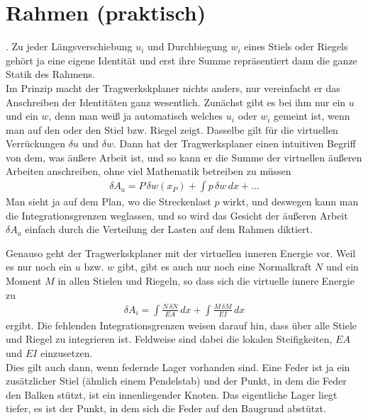 \section{Rahmen (praktisch)}
. Zu jeder L\"{a}ngsverschiebung $u_i $ und Durchbiegung $w_i $ eines Stiels oder Riegels geh\"{o}rt ja eine eigene Identit\"{a}t und erst ihre Summe repr\"{a}sentiert dann die ganze Statik des Rahmens.\\

Im Prinzip macht der Tragwerkskplaner nichts anders, nur vereinfacht er das Anschreiben der Identit\"{a}ten ganz wesentlich. Zun\"{a}chst gibt es bei ihm nur ein $u$ und ein $w$, denn man wei{\ss} ja automatisch welches $u_i $ oder $w_i $ gemeint ist, wenn man auf den oder den Stiel bzw. Riegel zeigt. Dasselbe gilt f\"{u}r die virtuellen Verr\"{u}ckungen $\delta u$ und $\delta w$. Dann hat der Tragwerksplaner einen intuitiven Begriff von dem, was \"{a}u{\ss}ere Arbeit ist, und so kann er die Summe der virtuellen \"{a}u{\ss}eren Arbeiten anschreiben, ohne viel Mathematik betreiben zu m\"{u}ssen
\begin{align}
\delta A_a = P\,\delta w(x_P) + \int p\,\delta w\,dx + \ldots
\end{align}
Man sieht ja auf dem Plan, wo die Streckenlast $p$ wirkt, und deswegen kann man die Integrationsgrenzen weglassen, und so wird das Gesicht der \"{a}u{\ss}eren Arbeit $\delta A_a $ einfach durch die Verteilung der Lasten auf dem Rahmen diktiert.

Genauso geht der Tragwerkskplaner mit der virtuellen inneren Energie vor. Weil es nur noch ein $u$ bzw. $w$ gibt, gibt es auch nur noch eine Normalkraft $N$ und ein Moment $M$ in allen Stielen und Riegeln, so dass sich die virtuelle innere Energie zu
\begin{align}
\delta A_i = \int \frac{N\,\delta N}{EA}\,dx + \int \frac{M\,\delta M}{EI}\,dx
\end{align}
ergibt. Die fehlenden Integrationsgrenzen weisen darauf hin, dass \"{u}ber alle Stiele und Riegel zu integrieren ist. Feldweise sind dabei die lokalen Steifigkeiten, $EA $ und $EI $ einzusetzen.\\

Dies gilt auch dann, wenn federnde Lager vorhanden sind. Eine Feder ist ja ein zus\"{a}tzlicher Stiel (\"{a}hnlich einem Pendelstab) und der Punkt, in dem die Feder den Balken st\"{u}tzt, ist ein innenliegender Knoten. Das eigentliche Lager liegt tiefer, es ist der Punkt, in dem sich die Feder auf den Baugrund abst\"{u}tzt.

